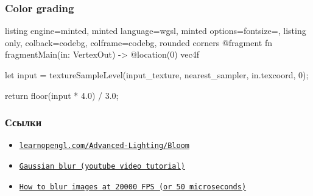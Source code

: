 \documentclass[10pt]{beamer}
\begin{document}
\begin{frame}[fragile]
\frametitle{Color grading}
\begin{tcblisting}{listing engine=minted, minted language=wgsl, minted options={fontsize=\scriptsize}, listing only, colback=codebg, colframe=codebg, rounded corners}
@fragment
fn fragmentMain(in: VertexOut) -> @location(0) vec4f {
    let input = textureSampleLevel(input_texture, nearest_sampler,
      in.texcoord, 0);

    return floor(input * 4.0) / 3.0;
}
\end{tcblisting}
\end{frame}

\begin{frame}[fragile]
\frametitle{Ссылки}
\begin{itemize}
\item \href{https://learnopengl.com/Advanced-Lighting/Bloom}{\nolinkurl{learnopengl.com/Advanced-Lighting/Bloom}}
\item \href{https://www.youtube.com/watch?v=uZlwbWqQKpc}{\texttt{Gaussian blur (youtube video tutorial)}}
\item \href{https://www.youtube.com/watch?v=YJVYX8tllj4}{\texttt{How to blur images at 20000 FPS (or 50 microseconds)}}
\end{itemize}
\end{frame}
\end{document}
